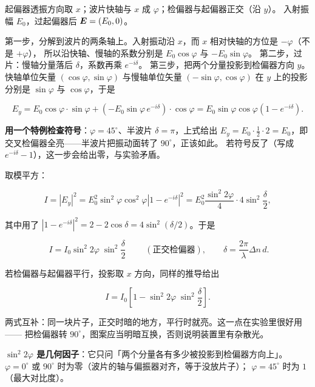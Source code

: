 \documentclass[11pt]{ctexart}
\let\subhdrtheme\subhdr
\renewcommand{\subhdr}[1]{\needspace{3\baselineskip}\subhdrtheme{#1}}
\let\hdrorig\hdr
\renewcommand{\hdr}[2]{\needspace{8\baselineskip}\hdrorig{#1}{#2}}
\begin{document}


起偏器透振方向取 $x$；波片快轴与 $x$ 成 $\varphi$；检偏器与起偏器正交（沿 $y$）。
入射振幅 $E_0$，过起偏器后 $\boldsymbol{E}=(E_0,0)$。

第一步，分解到波片的两条轴上。入射振动沿 $x$，而 $x$ 相对快轴的方位是 $-\varphi$（不是 $+\varphi$），
所以沿快轴、慢轴的系数分别是 $E_0\cos\varphi$ 与 $-E_0\sin\varphi$。
第二步，过片：慢轴分量落后 $\delta$，系数再乘 $e^{-i\delta}$。
第三步，把两个分量投影到检偏器方向 $y$。快轴单位矢量 $(\cos\varphi,\sin\varphi)$ 与慢轴单位矢量
$(-\sin\varphi,\cos\varphi)$ 在 $y$ 上的投影分别是 $\sin\varphi$ 与 $\cos\varphi$，于是

\[
E_y=E_0\cos\varphi\cdot\sin\varphi+\left(-E_0\sin\varphi\,e^{-i\delta}\right)\cdot\cos\varphi
=E_0\sin\varphi\cos\varphi\left(1-e^{-i\delta}\right).
\]

\textbf{用一个特例检查符号}：$\varphi=45^\circ$、半波片 $\delta=\pi$，上式给出
$E_y=E_0\cdot\tfrac12\cdot 2=E_0$，即交叉检偏器全亮——半波片把振动面转了 $90^\circ$，正该如此。
若符号反了（写成 $e^{-i\delta}-1$），这一步会给出零，与实验矛盾。

取模平方：

\[
I=|E_y|^2=E_0^2\sin^2\varphi\cos^2\varphi\left|1-e^{-i\delta}\right|^2
=E_0^2\frac{\sin^2 2\varphi}{4}\cdot 4\sin^2\frac{\delta}{2},
\]

其中用了 $|1-e^{-i\delta}|^2=2-2\cos\delta=4\sin^2(\delta/2)$。于是

\[
\boxed{\;I=I_0\sin^2 2\varphi\;\sin^2\frac{\delta}{2}\;}
\qquad(\text{正交检偏器}),\qquad \delta=\frac{2\pi}{\lambda}\Delta n\,d .
\]


若检偏器与起偏器平行，投影取 $x$ 方向，同样的推导给出

\[
I=I_0\left[1-\sin^2 2\varphi\;\sin^2\frac{\delta}{2}\right].
\]

两式互补：同一块片子，正交时暗的地方，平行时就亮。这一点在实验里很好用——
把检偏器转 $90^\circ$，图案应当明暗互换，否则说明装置里有杂散光。


\textbf{$\sin^2 2\varphi$ 是几何因子}：它只问「两个分量各有多少被投影到检偏器方向上」。
$\varphi=0^\circ$ 或 $90^\circ$ 时为零（波片的轴与偏振器对齐，等于没放片子）；
$\varphi=45^\circ$ 时为 $1$（最大对比度）。
\end{document}

